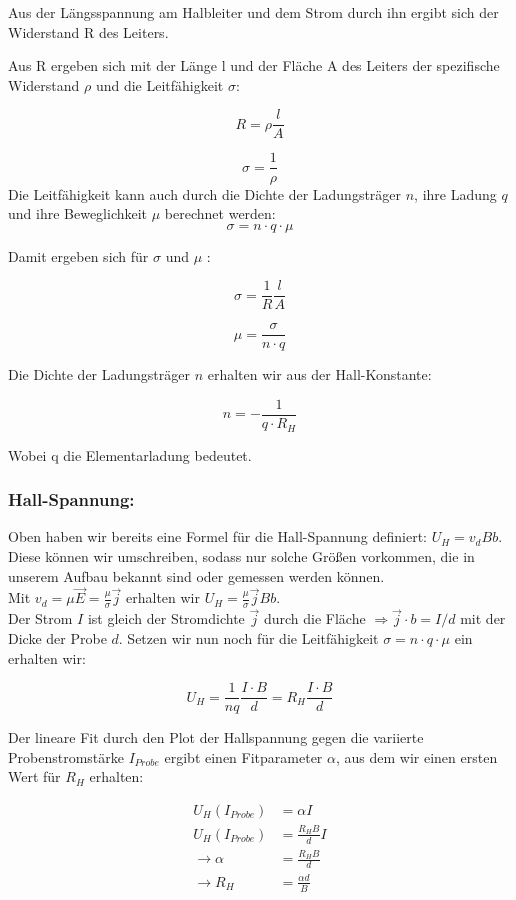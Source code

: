 \documentclass[12pt,a4paper,twopage]{article}
\begin{document}
Aus der Längsspannung am Halbleiter und dem Strom durch ihn ergibt sich der Widerstand R des Leiters.

Aus R ergeben sich mit der Länge l und der Fläche A des Leiters der spezifische Widerstand $\rho$ und die Leitfähigkeit $\sigma$:

$$ R = \rho \frac{l}{A} $$

$$ \sigma = \frac{1}{\rho} $$
Die Leitfähigkeit kann auch durch die Dichte der Ladungsträger $n$, ihre Ladung $q$ und ihre Beweglichkeit $\mu$ berechnet werden:
$$ \sigma = n \cdot q \cdot \mu $$

Damit ergeben sich für $\sigma$ und $\mu$ :

$$ \sigma = \frac{1}{R} \frac{l}{A} $$

$$ \mu = \frac{\sigma}{n \cdot q} $$

Die Dichte der Ladungsträger $n$ erhalten wir aus der Hall-Konstante:

$$ n = -\frac{1}{q\cdot R_H} $$

Wobei q die Elementarladung bedeutet.

\subsubsection*{Hall-Spannung:}
Oben haben wir bereits eine Formel für die Hall-Spannung definiert: $U_H=v_d B b$. Diese können wir umschreiben, sodass nur solche Größen vorkommen, die in unserem Aufbau bekannt sind oder gemessen werden können.\\
Mit $v_d=\mu \vec{E}=\frac{\mu}{\sigma}\vec{j}$ erhalten wir $U_H=\frac{\mu}{\sigma}\vec{j} B b$.\\
Der Strom $I$ ist gleich der Stromdichte $\vec{j}$ durch die Fläche $\Rightarrow \vec{j} \cdot b = I/d$ mit der Dicke der Probe $d$. Setzen wir nun noch für die Leitfähigkeit $\sigma=n \cdot q \cdot \mu$ ein erhalten wir: 

$$U_H=\frac{1}{nq} \frac{I \cdot B}{d}=R_H \frac{I \cdot B}{d}$$

Der lineare Fit durch den Plot der Hallspannung gegen die variierte Probenstromstärke $I_{Probe}$ ergibt einen Fitparameter $\alpha$, aus dem wir einen ersten Wert für $R_H$ erhalten:

\begin{equation}
\label{afit}
\begin{split}
U_H(I_{Probe})& = \alpha I \\
U_H(I_{Probe})& = \frac{R_H B}{d} I \\
\rightarrow \alpha & = \frac{R_H B}{d} \\
\rightarrow R_H & = \frac{\alpha d}{B}
\end{split}
\end{equation}
\end{document}
